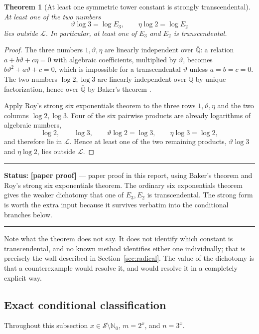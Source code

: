 \documentclass[11pt,oneside]{article}
\newtheorem{theorem}{Theorem}[section]
\theoremstyle{definition}
\theoremstyle{remark}
\newcommand{\Nzero}{\mathbb N_0}
\newcommand{\Q}{\mathbb Q}
\newcommand{\Abar}{\overline{\mathbb Q}}
\newcommand{\thetaq}{\vartheta}
\newcommand{\Sol}{\mathcal S}
\newcommand{\LL}{\mathcal L}
\newcommand{\statusnew}{\textcolor{newgreen}{\textbf{[paper proof]}}}
\newenvironment{statusbox}[1]
{\begin{center}\begin{minipage}{0.94\textwidth}\raggedright\hbadness=10000\hrule
\vspace{0.45em}\textbf{Status:} #1\par\vspace{0.35em}}
{\vspace{0.35em}\hrule\end{minipage}\end{center}}
\begin{document}
\begin{theorem}[At least one symmetric tower constant is strongly transcendental]
\label{tw:symmetric-unconditional}
At least one of the two numbers
\[
 \thetaq\log3=\log E_3,
 \qquad
 \eta\log2=\log E_2
\]
lies outside $\LL$.  In particular, at least one of $E_3$ and $E_2$ is transcendental.
\end{theorem}

\begin{proof}
The three numbers $1,\thetaq,\eta$ are linearly independent over $\Abar$: a relation
$a+b\thetaq+c\eta=0$ with algebraic coefficients, multiplied by $\thetaq$, becomes
$b\thetaq^2+a\thetaq+c=0$, which is impossible for a transcendental $\thetaq$ unless
$a=b=c=0$.  The two numbers $\log2,\log3$ are linearly independent over $\Q$ by unique
factorization, hence over $\Abar$ by Baker's theorem \cite{Baker1975}.

Apply Roy's strong six exponentials theorem \cite{Roy1992,Waldschmidt2005} to the three rows
$1,\thetaq,\eta$ and the two columns $\log2,\log3$.  Four of the six pairwise products are
already logarithms of algebraic numbers,
\[
 \log2,\qquad\log3,\qquad\thetaq\log2=\log3,\qquad\eta\log3=\log2,
\]
and therefore lie in $\LL$.  Hence at least one of the two remaining products,
$\thetaq\log3$ and $\eta\log2$, lies outside $\LL$.
\end{proof}

\begin{statusbox}{\statusnew{} --- paper proof in this report, using Baker's theorem and
Roy's strong six exponentials theorem.  The ordinary six exponentials theorem gives the
weaker dichotomy that one of $E_3,E_2$ is transcendental.  The strong form is worth the extra
input because it survives verbatim into the conditional branches below.}
\end{statusbox}

Note what the theorem does not say.  It does not identify which constant is transcendental,
and no known method identifies either one individually; that is precisely the wall described
in Section~\ref{sec:radical}.  The value of the dichotomy is that a counterexample would
resolve it, and would resolve it in a completely explicit way.

\subsection{Exact conditional classification}

Throughout this subsection $x\in\Sol\setminus\Nzero$, $m=2^x$, and $n=3^x$.
\end{document}

